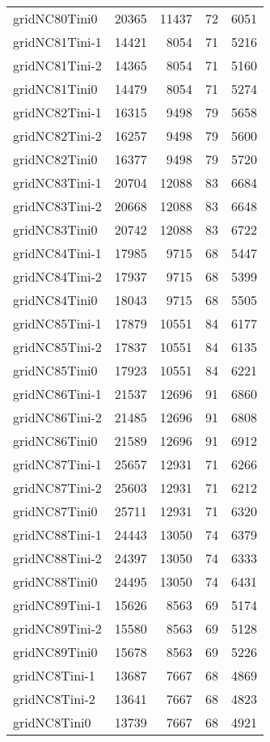 \begin{longtable}{lrrrr}
gridNC80Tini0 & 20365 & 11437 & 72 & 6051 \\
gridNC81Tini-1 & 14421 & 8054 & 71 & 5216 \\
gridNC81Tini-2 & 14365 & 8054 & 71 & 5160 \\
gridNC81Tini0 & 14479 & 8054 & 71 & 5274 \\
gridNC82Tini-1 & 16315 & 9498 & 79 & 5658 \\
gridNC82Tini-2 & 16257 & 9498 & 79 & 5600 \\
gridNC82Tini0 & 16377 & 9498 & 79 & 5720 \\
gridNC83Tini-1 & 20704 & 12088 & 83 & 6684 \\
gridNC83Tini-2 & 20668 & 12088 & 83 & 6648 \\
gridNC83Tini0 & 20742 & 12088 & 83 & 6722 \\
gridNC84Tini-1 & 17985 & 9715 & 68 & 5447 \\
gridNC84Tini-2 & 17937 & 9715 & 68 & 5399 \\
gridNC84Tini0 & 18043 & 9715 & 68 & 5505 \\
gridNC85Tini-1 & 17879 & 10551 & 84 & 6177 \\
gridNC85Tini-2 & 17837 & 10551 & 84 & 6135 \\
gridNC85Tini0 & 17923 & 10551 & 84 & 6221 \\
gridNC86Tini-1 & 21537 & 12696 & 91 & 6860 \\
gridNC86Tini-2 & 21485 & 12696 & 91 & 6808 \\
gridNC86Tini0 & 21589 & 12696 & 91 & 6912 \\
gridNC87Tini-1 & 25657 & 12931 & 71 & 6266 \\
gridNC87Tini-2 & 25603 & 12931 & 71 & 6212 \\
gridNC87Tini0 & 25711 & 12931 & 71 & 6320 \\
gridNC88Tini-1 & 24443 & 13050 & 74 & 6379 \\
gridNC88Tini-2 & 24397 & 13050 & 74 & 6333 \\
gridNC88Tini0 & 24495 & 13050 & 74 & 6431 \\
gridNC89Tini-1 & 15626 & 8563 & 69 & 5174 \\
gridNC89Tini-2 & 15580 & 8563 & 69 & 5128 \\
gridNC89Tini0 & 15678 & 8563 & 69 & 5226 \\
gridNC8Tini-1 & 13687 & 7667 & 68 & 4869 \\
gridNC8Tini-2 & 13641 & 7667 & 68 & 4823 \\
gridNC8Tini0 & 13739 & 7667 & 68 & 4921 \\

\end{longtable}
